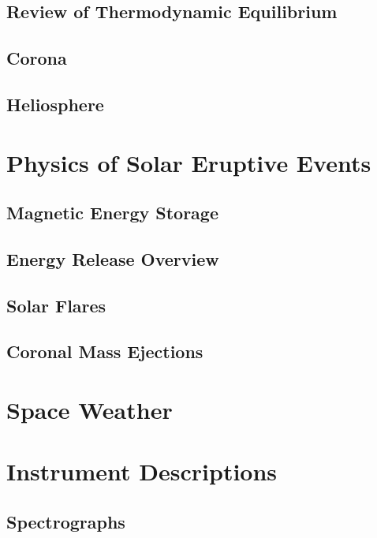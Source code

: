 \subsection{Review of Thermodynamic Equilibrium} 

\subsection{Corona}

\subsection{Heliosphere}

\section{Physics of Solar Eruptive Events}
\label{sec:physicssolareruptiveevents}

\subsection{Magnetic Energy Storage}

\subsection{Energy Release Overview}

\subsection{Solar Flares}

\subsection{Coronal Mass Ejections}

\section{Space Weather}

\section{Instrument Descriptions}
\label{sec:instruments}

\subsection{Spectrographs}

